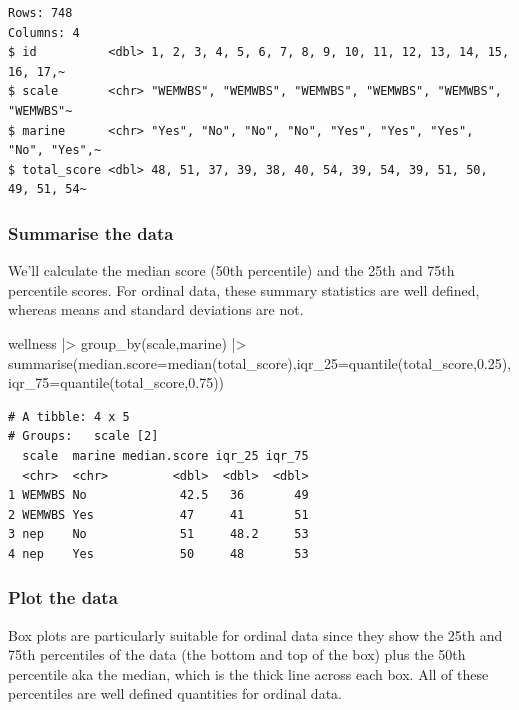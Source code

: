 \documentclass[
  letterpaper,
  DIV=11,
  numbers=noendperiod]{scrreprt}
\newenvironment{Shaded}{\begin{snugshade}}{\end{snugshade}}
\newcommand{\AttributeTok}[1]{\textcolor[rgb]{0.40,0.45,0.13}{#1}}
\newcommand{\FloatTok}[1]{\textcolor[rgb]{0.68,0.00,0.00}{#1}}
\newcommand{\FunctionTok}[1]{\textcolor[rgb]{0.28,0.35,0.67}{#1}}
\newcommand{\NormalTok}[1]{\textcolor[rgb]{0.00,0.23,0.31}{#1}}
\newcommand{\SpecialCharTok}[1]{\textcolor[rgb]{0.37,0.37,0.37}{#1}}
\begin{document}
\begin{verbatim}
Rows: 748
Columns: 4
$ id          <dbl> 1, 2, 3, 4, 5, 6, 7, 8, 9, 10, 11, 12, 13, 14, 15, 16, 17,~
$ scale       <chr> "WEMWBS", "WEMWBS", "WEMWBS", "WEMWBS", "WEMWBS", "WEMWBS"~
$ marine      <chr> "Yes", "No", "No", "No", "Yes", "Yes", "Yes", "No", "Yes",~
$ total_score <dbl> 48, 51, 37, 39, 38, 40, 54, 39, 54, 39, 51, 50, 49, 51, 54~
\end{verbatim}

\subsubsection{Summarise the data}\label{summarise-the-data-1}

We'll calculate the median score (50th percentile) and the 25th and 75th
percentile scores. For ordinal data, these summary statistics are well
defined, whereas means and standard deviations are not.

\begin{Shaded}
\begin{Highlighting}[]
\NormalTok{wellness }\SpecialCharTok{|\textgreater{}}
  \FunctionTok{group\_by}\NormalTok{(scale,marine) }\SpecialCharTok{|\textgreater{}}
  \FunctionTok{summarise}\NormalTok{(}\AttributeTok{median.score=}\FunctionTok{median}\NormalTok{(total\_score),}\AttributeTok{iqr\_25=}\FunctionTok{quantile}\NormalTok{(total\_score,}\FloatTok{0.25}\NormalTok{),}\AttributeTok{iqr\_75=}\FunctionTok{quantile}\NormalTok{(total\_score,}\FloatTok{0.75}\NormalTok{))}
\end{Highlighting}
\end{Shaded}

\begin{verbatim}
# A tibble: 4 x 5
# Groups:   scale [2]
  scale  marine median.score iqr_25 iqr_75
  <chr>  <chr>         <dbl>  <dbl>  <dbl>
1 WEMWBS No             42.5   36       49
2 WEMWBS Yes            47     41       51
3 nep    No             51     48.2     53
4 nep    Yes            50     48       53
\end{verbatim}

\subsubsection{Plot the data}\label{plot-the-data-1}

Box plots are particularly suitable for ordinal data since they show the
25th and 75th percentiles of the data (the bottom and top of the box)
plus the 50th percentile aka the median, which is the thick line across
each box. All of these percentiles are well defined quantities for
ordinal data.
\end{document}
